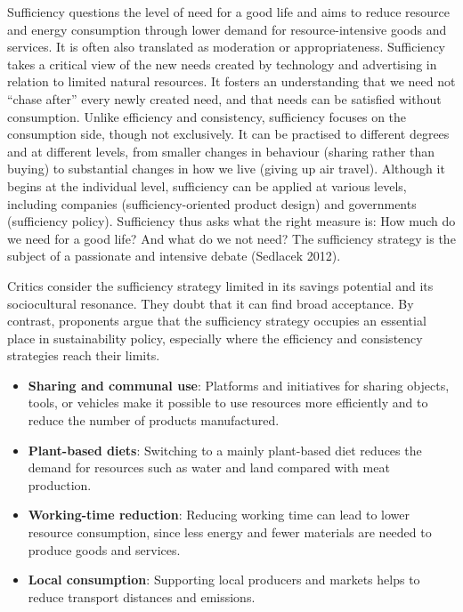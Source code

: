 \documentclass[
  british,
  a4paper,
  DIV=11,
  numbers=noendperiod,
  oneside,
  openany]{scrreprt}
\providecommand{\tightlist}{%
  \setlength{\itemsep}{0pt}\setlength{\parskip}{0pt}}
\begin{document}
Sufficiency questions the level of need for a good life and aims to
reduce resource and energy consumption through lower demand for
resource-intensive goods and services. It is often also translated as
moderation or appropriateness. Sufficiency takes a critical view of the
new needs created by technology and advertising in relation to limited
natural resources. It fosters an understanding that we need not ``chase
after'' every newly created need, and that needs can be satisfied
without consumption. Unlike efficiency and consistency, sufficiency
focuses on the consumption side, though not exclusively. It can be
practised to different degrees and at different levels, from smaller
changes in behaviour (sharing rather than buying) to substantial changes
in how we live (giving up air travel). Although it begins at the
individual level, sufficiency can be applied at various levels,
including companies (sufficiency-oriented product design) and
governments (sufficiency policy). Sufficiency thus asks what the right
measure is: How much do we need for a good life? And what do we not
need? The sufficiency strategy is the subject of a passionate and
intensive debate (Sedlacek 2012).

Critics consider the sufficiency strategy limited in its savings
potential and its sociocultural resonance. They doubt that it can find
broad acceptance. By contrast, proponents argue that the sufficiency
strategy occupies an essential place in sustainability policy,
especially where the efficiency and consistency strategies reach their
limits.

\begin{tcolorbox}[enhanced jigsaw, arc=.35mm, bottomrule=.15mm, bottomtitle=1mm, breakable, colback=white, colbacktitle=quarto-callout-tip-color!10!white, colframe=quarto-callout-tip-color-frame, coltitle=black, left=2mm, leftrule=.75mm, opacityback=0, opacitybacktitle=0.6, rightrule=.15mm, title={Examples of the sufficiency strategy}, titlerule=0mm, toprule=.15mm, toptitle=1mm]

\begin{itemize}
\tightlist
\item
  \textbf{Sharing and communal use}: Platforms and initiatives for
  sharing objects, tools, or vehicles make it possible to use resources
  more efficiently and to reduce the number of products manufactured.
\item
  \textbf{Plant-based diets}: Switching to a mainly plant-based diet
  reduces the demand for resources such as water and land compared with
  meat production.
\item
  \textbf{Working-time reduction}: Reducing working time can lead to
  lower resource consumption, since less energy and fewer materials are
  needed to produce goods and services.
\item
  \textbf{Local consumption}: Supporting local producers and markets
  helps to reduce transport distances and emissions.
\end{itemize}

\end{tcolorbox}
\end{document}
